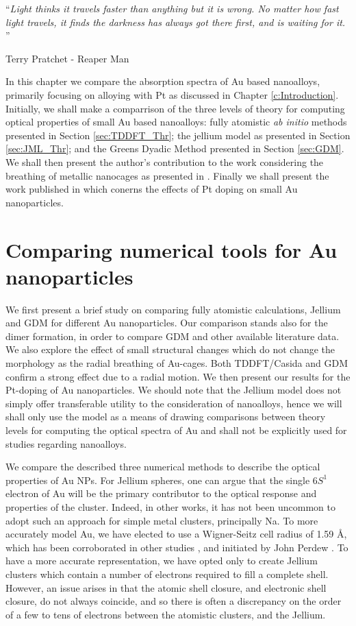 \noindent\enquote{\itshape Light thinks it travels faster than anything but it is wrong. No matter how fast light travels, it finds the darkness has always got there first, and is waiting for it. }\bigbreak

\hfill Terry Pratchet - Reaper Man

\vspace*{0.05\textheight}

In this chapter we compare the absorption spectra of Au based nanoalloys, primarily focusing on alloying with Pt as discussed in Chapter \ref{c:Introduction}. Initially, we shall make a comparrison of the three levels of theory for computing optical properties of small Au based nanoalloys: fully atomistic \textit{ab initio} methods presented in Section \ref{sec:TDDFT_Thr}; the jellium model as presented in Section \ref{sec:JML_Thr}; and the Greens Dyadic Method presented in Section \ref{sec:GDM}. We shall then present the author's contribution to the work considering the breathing of metallic nanocages as presented in \cite{Wei}. Finally we shall present the work published in \cite{JonesAuPt} which conerns the effects of Pt doping on small Au nanoparticles. 

\section{Comparing numerical tools for Au nanoparticles}
\label{Jellium}
We first present a brief study on comparing fully atomistic calculations, Jellium and GDM for different Au nanoparticles. Our comparison stands also for the dimer formation, in order to compare GDM and other available literature data. We also explore the effect of small structural changes which do not change the morphology as the radial breathing of Au-cages. Both TDDFT/Casida and GDM confirm a strong effect due to a radial motion. We then present our results for the Pt-doping of Au nanoparticles. We should note that the Jellium model does not simply offer transferable utility to the consideration of nanoalloys, hence we will shall only use the model as a means of drawing comparisons between theory levels for computing the optical spectra of Au and shall not be explicitly used for studies regarding nanoalloys.

We compare the described three numerical methods to describe the optical properties of Au NPs. For Jellium spheres, one can argue that the single 6$S^{1}$ electron of Au will be the primary contributor to the optical response and properties of the cluster. Indeed, in other works, it has not been uncommon to adopt such an approach for simple metal clusters, principally Na. To more accurately model Au, we have elected to use a Wigner-Seitz cell radius of 1.59 \AA, which has been corroborated in other studies \cite{Au_Jlm}, and initiated by John Perdew \cite{Jlm_R}. To have a more accurate representation, we have opted only to create Jellium clusters which contain a number of electrons required to fill a complete shell. However, an issue arises in that the atomic shell closure, and electronic shell closure, do not always coincide, and so there is often a discrepancy on the order of a few to tens of electrons between the atomistic clusters, and the Jellium. 

